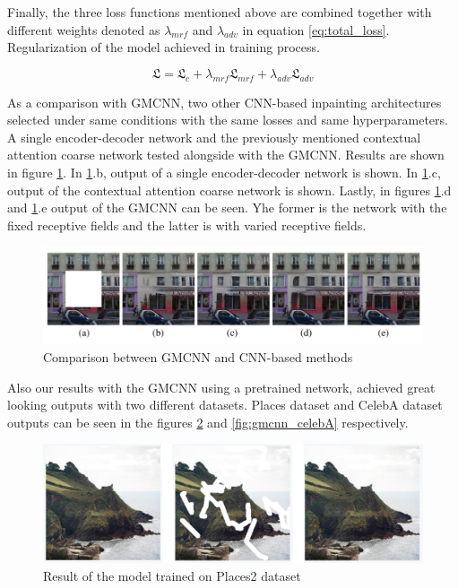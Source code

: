 Finally, the three loss functions mentioned above are combined together with different weights denoted as \(\lambda_{mrf}\) and \(\lambda_{adv}\) in equation \ref{eq:total_loss}. Regularization of the model achieved in training process.

\begin{equation}
    \mathfrak{L} = \mathfrak{L}_{c} + \lambda_{mrf} \mathfrak{L}_{mrf} + \lambda_{adv} \mathfrak{L}_{adv}
    \label{eq:total_loss}
\end{equation}

As a comparison with GMCNN, two other CNN-based inpainting architectures selected under same conditions with the same losses and same hyperparameters. A single encoder-decoder network and the previously mentioned contextual attention coarse network \cite{generative_contextual} tested alongside with the GMCNN. Results are shown in figure \ref{fig:gmcnn_paris_comparison}. In \ref{fig:gmcnn_paris_comparison}.b, output of a single encoder-decoder network is shown. In \ref{fig:gmcnn_paris_comparison}.c, output of the contextual attention
coarse network is shown. Lastly, in figures \ref{fig:gmcnn_paris_comparison}.d and \ref{fig:gmcnn_paris_comparison}.e output of the GMCNN can be seen. Yhe former is the network with the fixed receptive fields and the latter is with varied receptive fields.

\begin{figure}[h]
    \centering
    \includegraphics[width=14cm]{figures/chapter4/gmcnn_paris_comparison.png}
    \caption{Comparison between GMCNN and CNN-based methods \cite{inpainting_via_multi_cnn}}
    \label{fig:gmcnn_paris_comparison}
\end{figure}

Also our results with the GMCNN using a pretrained network, achieved great looking outputs with two different datasets. Places \cite{dataset_places} dataset and CelebA \cite{celebA} dataset outputs can be seen in the figures \ref{fig:gmcnn_places2} and \ref{fig:gmcnn_celebA} respectively.

\begin{figure}[h]
    \centering
    \includegraphics[width=14cm]{figures/chapter4/gmcnnout2.png}
    \vspace*{3mm}
    \caption{Result of the model trained on Places2 dataset}
    \label{fig:gmcnn_places2}
\end{figure}

